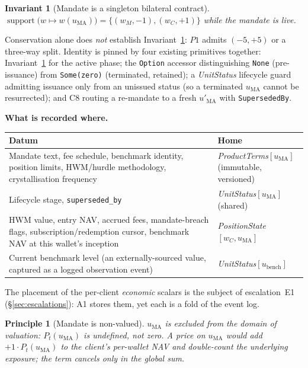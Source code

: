 \documentclass[11pt,a4paper]{article}
\newtheorem{principle}[definition]{Principle}
\newtheorem{invariant}[definition]{Invariant}
\begin{document}
\begin{invariant}[Mandate is a singleton bilateral contract]
\label{inv:singleton}
$\operatorname{support}\big(w\mapsto w(u_{\mathrm{MA}})\big)=\{(w_M,-1),(w_C,+1)\}$ while the
mandate is live.
\end{invariant}

\noindent Conservation alone does \emph{not} establish Invariant~\ref{inv:singleton}: $P1$ admits
$(-5,+5)$ or a three-way split. Identity is pinned by four existing primitives together:
Invariant~\ref{inv:singleton} for the active phase; the \texttt{Option} accessor distinguishing
\texttt{None} (pre-issuance) from \texttt{Some(zero)} (terminated, retained); a
\textit{UnitStatus} lifecycle guard admitting issuance only from an unissued status (so a
terminated $u_{\mathrm{MA}}$ cannot be resurrected); and C8 routing a re-mandate to a fresh
$u'_{\mathrm{MA}}$ with \texttt{SupersededBy}.

\noindent\textbf{What is recorded where.}

\begin{longtable}{p{8.4cm}p{6.4cm}}
\toprule
\textbf{Datum} & \textbf{Home} \\
\midrule
Mandate text, fee schedule, benchmark identity, position limits, HWM/hurdle methodology,
crystallisation frequency & \textit{ProductTerms}$[u_{\mathrm{MA}}]$ (immutable, versioned) \\
Lifecycle stage, \texttt{superseded\_by} & \textit{UnitStatus}$[u_{\mathrm{MA}}]$ (shared) \\
HWM value, entry NAV, accrued fees, mandate-breach flags, subscription/redemption cursor,
benchmark NAV at this wallet's inception & \textit{PositionState}$[w_C,u_{\mathrm{MA}}]$ \\
Current benchmark level (an externally-sourced value, captured as a logged observation event) & \textit{UnitStatus}$[u_{\mathrm{bench}}]$ \\
\bottomrule
\end{longtable}

\noindent The placement of the per-client \emph{economic} scalars is the subject of
escalation~E1 (\S\ref{sec:escalations}): A1 stores them, yet each is a fold of the event log.

\begin{principle}[Mandate is non-valued]
\label{prin:nonvalued}
$u_{\mathrm{MA}}$ is excluded from the domain of valuation: $P_t(u_{\mathrm{MA}})$ is undefined,
not zero. A price on $u_{\mathrm{MA}}$ would add $+1\cdot P_t(u_{\mathrm{MA}})$ to the client's
per-wallet NAV and double-count the underlying exposure; the term cancels only in the global sum.
\end{principle}
\end{document}
